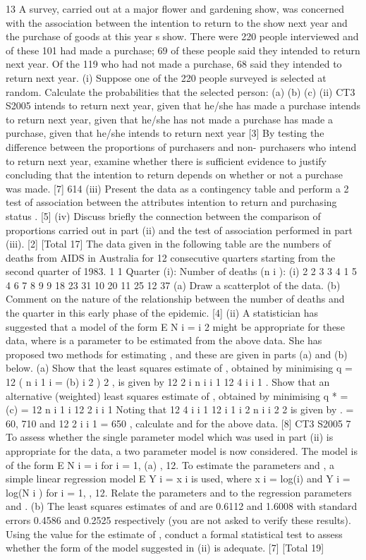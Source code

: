 \documentclass[a4paper,12pt]{article}
\begin{document}
13
A survey, carried out at a major flower and gardening show, was concerned with the
association between the intention to return to the show next year and the purchase of
goods at this year s show. There were 220 people interviewed and of these 101 had
made a purchase; 69 of these people said they intended to return next year. Of the
119 who had not made a purchase, 68 said they intended to return next year.
(i)
Suppose one of the 220 people surveyed is selected at random.
Calculate the probabilities that the selected person:
(a)
(b)
(c)
(ii)
CT3 S2005
intends to return next year, given that he/she has made a purchase
intends to return next year, given that he/she has not made a purchase
has made a purchase, given that he/she intends to return next year
[3]
By testing the difference between the proportions of purchasers and non-
purchasers who intend to return next year, examine whether there is sufficient
evidence to justify concluding that the intention to return depends on whether
or not a purchase was made.
[7]
614
(iii) Present the data as a contingency table and perform a 2 test of association
between the attributes intention to return and purchasing status .
[5]
(iv) Discuss briefly the connection between the comparison of proportions carried
out in part (ii) and the test of association performed in part (iii).
[2]
[Total 17]
The data given in the following table are the numbers of deaths from AIDS in
Australia for 12 consecutive quarters starting from the second quarter of 1983.
1
1
Quarter (i):
Number of deaths (n i ):
(i)
2
2
3
3
4
1
5
4
6 7 8 9
9 18 23 31
10
20
11
25
12
37
(a) Draw a scatterplot of the data.
(b) Comment on the nature of the relationship between the number of
deaths and the quarter in this early phase of the epidemic.
[4]
(ii)
A statistician has suggested that a model of the form
E N i = i 2
might be appropriate for these data, where is a parameter to be estimated
from the above data. She has proposed two methods for estimating , and
these are given in parts (a) and (b) below.
(a)
Show that the least squares estimate of , obtained by minimising
q =
12
( n
i 1 i
=
(b)
i 2 ) 2 , is given by
12 2
i n i
i 1
12 4
i
i 1
.
Show that an alternative (weighted) least squares estimate of ,
obtained by minimising q * =
(c)
= 12
n
i 1 i
12 2
i
i 1
Noting that 12 4
i
i 1
12
i 1
i 2
n i
i 2
2
is given by
.
= 60, 710 and
12 2
i
i 1
= 650 , calculate
and
for the above data.
[8]
CT3 S2005
7
To assess whether the single parameter model which was used in part (ii) is
appropriate for the data, a two parameter model is now considered. The model
is of the form
E N i = i
for i = 1,
(a)
, 12.
To estimate the parameters and , a simple linear regression model
E Y i =
x i
is used, where x i = log(i) and Y i = log(N i ) for i = 1, , 12. Relate the
parameters and to the regression parameters and .
(b)
The least squares estimates of and are 0.6112 and 1.6008 with
standard errors 0.4586 and 0.2525 respectively (you are not asked to
verify these results).
Using the value for the estimate of , conduct a formal statistical test to
assess whether the form of the model suggested in (ii) is adequate.
[7]
[Total 19]
\end{document}
